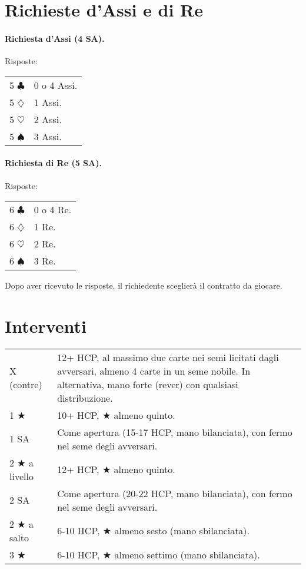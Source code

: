 \documentclass[a4paper,10pt]{article}
\renewcommand{\c}{$\clubsuit$\xspace}
\renewcommand{\d}{$\diamondsuit$\xspace}
\newcommand{\h}{$\heartsuit$\xspace}
\newcommand{\s}{$\spadesuit$\xspace}
\renewcommand{\j}{$\bigstar$\xspace}
\newcommand{\sa}{SA\xspace}
\newcommand{\smallspace}{\vskip0.3cm}
\newenvironment{twocol}
  {\smallspace\noindent\begin{tabular}{l p{0.78\textwidth}}}
  {\end{tabular}\smallspace}
\begin{document}
\section{Richieste d'Assi e di Re}

\paragraph{Richiesta d'Assi (4 \sa).} Risposte:

\begin{twocol}
5 \c & 0 o 4 Assi.\\
5 \d & 1 Assi.\\
5 \h & 2 Assi.\\
5 \s & 3 Assi.
\end{twocol}

\paragraph{Richiesta di Re (5 \sa).} Risposte:

\begin{twocol}
6 \c & 0 o 4 Re.\\
6 \d & 1 Re.\\
6 \h & 2 Re.\\
6 \s & 3 Re.
\end{twocol}

Dopo aver ricevuto le risposte, il richiedente sceglierà il contratto da giocare.

\section{Interventi}

\begin{twocol}
  X (contre) & 12+ HCP, al massimo due carte nei semi licitati dagli avversari, almeno 4 carte in un seme nobile. In alternativa, mano forte (rever) con qualsiasi distribuzione.\\
  1 \j & 10+ HCP, \j almeno quinto.\\
  1 \sa & Come apertura (15-17 HCP, mano bilanciata), con fermo nel seme degli avversari.\\
  2 \j a livello & 12+ HCP, \j almeno quinto.\\
  2 \sa & Come apertura (20-22 HCP, mano bilanciata), con fermo nel seme degli avversari.\\
  2 \j a salto & 6-10 HCP, \j almeno sesto (mano sbilanciata).\\
  3 \j & 6-10 HCP, \j almeno settimo (mano sbilanciata).
\end{twocol}
\end{document}
